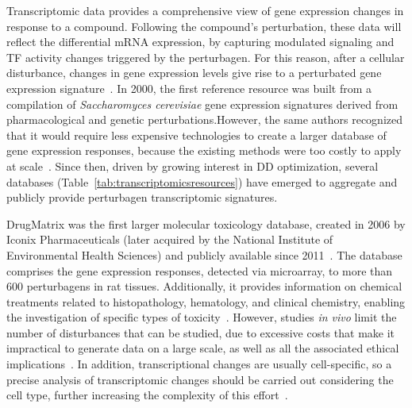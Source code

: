 Transcriptomic data provides a comprehensive view of gene expression changes in response to a compound. 
Following the compound's perturbation, these data will reflect the differential \gls{mRNA} expression, by capturing modulated signaling and \gls{TF} activity changes triggered by the perturbagen.
For this reason, after a cellular disturbance, changes in gene expression levels give rise to a perturbated gene expression signature~\cite{RN114}.
In 2000, the first reference resource was built from a compilation of \textit{Saccharomyces cerevisiae} gene expression signatures derived from pharmacological and genetic perturbations.However, the same authors recognized that it would require less expensive technologies to create a larger database of gene expression responses, because the existing methods were too costly to apply at scale~\cite{RN115, RN116, RN117}.
Since then, driven by growing interest in \gls{DD} optimization, several databases (Table~\ref{tab:transcriptomicsresources}) have emerged to aggregate and publicly provide perturbagen transcriptomic signatures.

DrugMatrix was the first larger molecular toxicology database, created in 2006 by Iconix Pharmaceuticals (later acquired by the National Institute of Environmental Health Sciences) and publicly available since 2011~\cite{RN115, RN118, RN119}. 
The database comprises the gene expression responses, detected via microarray, to more than 600 perturbagens in rat tissues. 
Additionally, it provides information on chemical treatments related to histopathology, hematology, and clinical chemistry, enabling the investigation of specific types of toxicity~\cite{RN121}. 
However, studies \textit{in vivo} limit the number of disturbances that can be studied, due to excessive costs that make it impractical to generate data on a large scale, as well as all the associated ethical implications~\cite{RN34}. 
In addition, transcriptional changes are usually cell-specific, so a precise analysis of transcriptomic changes should be carried out considering the cell type, further increasing the complexity of this effort~\cite{RN86}.


